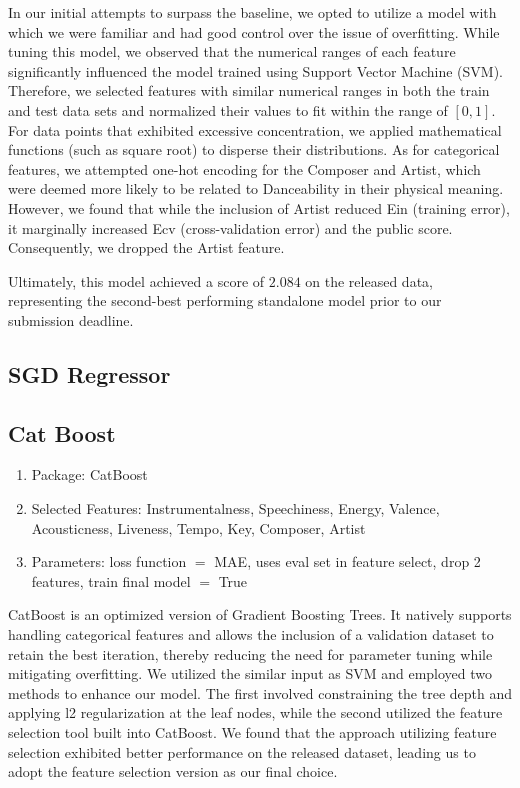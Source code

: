 \documentclass[10pt,letterpaper]{article}
\begin{document}
In our initial attempts to surpass the baseline, 
we opted to utilize a model with which we were familiar and had good control over the issue of overfitting. 
While tuning this model, we observed that the numerical ranges of each feature significantly influenced the model trained using Support Vector Machine (SVM). 
Therefore, we selected features with similar numerical ranges in both the train and test data sets and normalized their values to fit within the range of $[0, 1]$. 
For data points that exhibited excessive concentration, we applied mathematical functions (such as square root) to disperse their distributions. 
As for categorical features, we attempted one-hot encoding for the Composer and Artist, 
which were deemed more likely to be related to Danceability in their physical meaning. 
However, we found that while the inclusion of Artist reduced Ein (training error), 
it marginally increased Ecv (cross-validation error) and the public score. 
Consequently, we dropped the Artist feature.

Ultimately, this model achieved a score of $2.084$ on the released data, 
representing the second-best performing standalone model prior to our submission deadline.

\subsection{SGD Regressor}
\subsection{Cat Boost}
\begin{enumerate}
	\item Package: CatBoost
	\item Selected Features: Instrumentalness, Speechiness, Energy, Valence, Acousticness, Liveness, Tempo, Key, Composer, Artist
	\item Parameters: loss function $=$ MAE, uses eval set in feature select, drop 2 features, train final model $=$ True
\end{enumerate}

CatBoost is an optimized version of Gradient Boosting Trees. 
It natively supports handling categorical features and allows the inclusion of a validation dataset to retain the best iteration, 
thereby reducing the need for parameter tuning while mitigating overfitting. 
We utilized the similar input as SVM and employed two methods to enhance our model. 
The first involved constraining the tree depth and applying l2 regularization at the leaf nodes, 
while the second utilized the feature selection tool built into CatBoost. 
We found that the approach utilizing feature selection exhibited better performance on the released dataset, 
leading us to adopt the feature selection version as our final choice.
\end{document}
